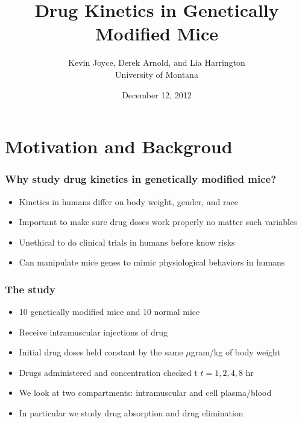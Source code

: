 \documentclass[t]{beamer}
\title{Drug Kinetics in Genetically Modified Mice}
\author{Kevin Joyce, Derek Arnold, and Lia Harrington \\
        University of Montana}
\date{December 12, 2012}
\begin{document}

\begin{frame}
\titlepage
\end{frame}

\section{Motivation and Backgroud}

\begin{frame}
\frametitle{Why study drug kinetics in genetically modified mice?}
\begin{itemize}
  \item Kinetics in humans differ on body weight, gender, and race
  \item Important to make sure drug doses work properly no matter such variables
  \item Unethical to do clinical trials in humans before know risks
  \item Can manipulate mice genes to mimic physiological behaviors in humans
\end{itemize}
\end{frame}
\begin{frame}
\frametitle{The study}
\begin{itemize}
\item 10 genetically modified mice and 10 normal mice
\item Receive intramuscular injections of drug
\item Initial drug doses held constant by the same $\mu$gram/kg of body weight
\item Drugs administered and concentration checked t $t = 1, 2, 4, 8$ hr
\item We look at two compartments: intramuscular and cell plasma/blood
\item In particular we study drug absorption and drug elimination 
\end{itemize}
\end{frame}
\end{document}
